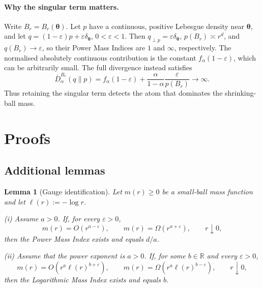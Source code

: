 \documentclass[11pt,a4paper]{article}
\newcommand{\pa}{\boldsymbol\theta}
\theoremstyle{compactplain}
\newtheorem{lemma}[theorem]{Lemma}
\theoremstyle{compactdefinition}
\numberwithin{equation}{section}
\begin{document}
\paragraph{Why the singular term matters.}
Write \(B_r=B_r(\pa)\). Let \(p\) have a continuous, positive Lebesgue density near \(\pa\), and let
\(q=(1-\varepsilon)p+\varepsilon\delta_{\pa}\), \(0<\varepsilon<1\).
Then \(q_{\perp p}=\varepsilon\delta_{\pa}\), \(p(B_r)\asymp r^d\), and
\(q(B_r)\to\varepsilon\), so their Power Mass Indices are \(1\) and \(\infty\), respectively.
The normalised absolutely continuous contribution is the constant
\(f_\alpha(1-\varepsilon)\), which can be arbitrarily small. The full divergence instead satisfies
\[
\overline D_\alpha^{B_r}(q\|p)
=f_\alpha(1-\varepsilon)+\frac{\alpha}{1-\alpha}\frac{\varepsilon}{p(B_r)}
\longrightarrow\infty.
\]
Thus retaining the singular term detects the atom that dominates the shrinking-ball mass.

\section{Proofs}
\label{app:proofs}

\subsection{Additional lemmas}

\begin{lemma}[Gauge identification]
\label{lem:gauge-identification}
Let \(m(r)\ge0\) be a small-ball mass function and let \(\ell(r):=-\log r\).

\textnormal{(i)} Assume \(a>0\). If, for every \(\varepsilon>0\),
\[
 m(r)=O(r^{a-\varepsilon}),
 \qquad
 m(r)=\Omega(r^{a+\varepsilon}),
 \qquad r\downarrow0,
\]
then the Power Mass Index exists and equals \(d/a\).

\textnormal{(ii)} Assume that the power exponent is \(a>0\). If, for some
\(b\in\mathbb R\) and every \(\varepsilon>0\),
\[
 m(r)=O\!\left(r^a\ell(r)^{b+\varepsilon}\right),
 \qquad
 m(r)=\Omega\!\left(r^a\ell(r)^{b-\varepsilon}\right),
 \qquad r\downarrow0,
\]
then the Logarithmic Mass Index exists and equals \(b\).
\end{lemma}
\end{document}
